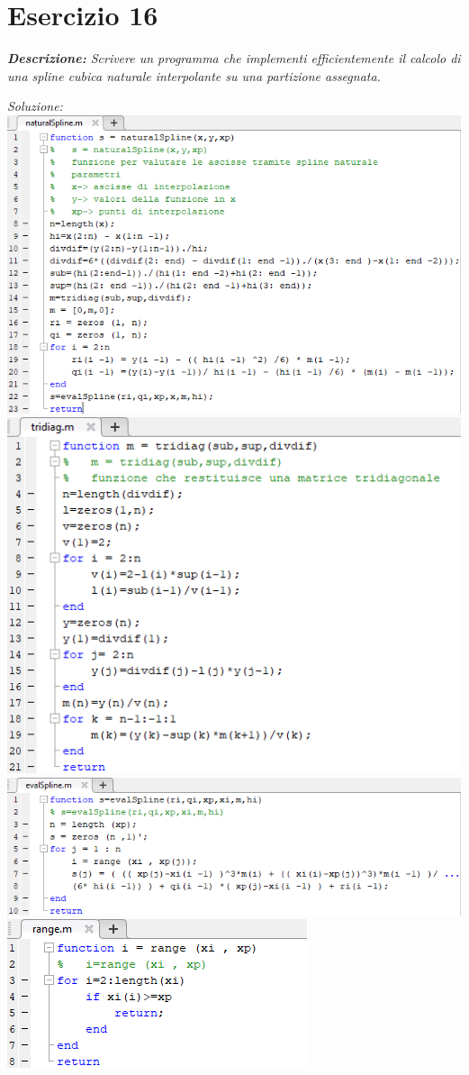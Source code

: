 \section{Esercizio 16}
\textit{\textbf{Descrizione:} Scrivere un programma che implementi efficientemente il calcolo di una spline cubica naturale interpolante su una partizione assegnata.}\newline

\noindent\emph{Soluzione: }\newline
\includegraphics[width=1.3\linewidth]{img/naturalSpline.png}
\includegraphics[width=1.3\linewidth]{img/tridiag.png}
\includegraphics[width=1.3\linewidth]{img/evalSpline.png}
\includegraphics[width=.8\linewidth]{img/range.png}